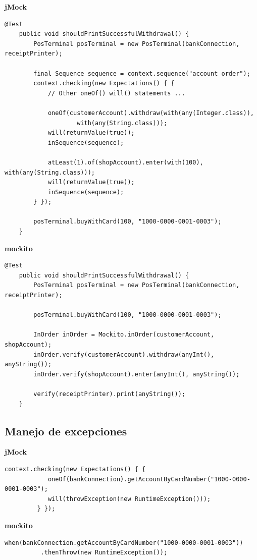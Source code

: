 \documentclass[]{beamer}
\begin{document}
\begin{frame}[fragile]
\textbf{jMock}
\begin{verbatim}
@Test
    public void shouldPrintSuccessfulWithdrawal() {
        PosTerminal posTerminal = new PosTerminal(bankConnection, receiptPrinter);

        final Sequence sequence = context.sequence("account order");
        context.checking(new Expectations() { {
            // Other oneOf() will() statements ...

            oneOf(customerAccount).withdraw(with(any(Integer.class)),
                    with(any(String.class)));
            will(returnValue(true));
            inSequence(sequence);

            atLeast(1).of(shopAccount).enter(with(100), with(any(String.class)));
            will(returnValue(true));
            inSequence(sequence);
        } });

        posTerminal.buyWithCard(100, "1000-0000-0001-0003");
    }
\end{verbatim}
\end{frame}

\begin{frame}[fragile]
  \textbf{mockito}
\begin{verbatim}
@Test
    public void shouldPrintSuccessfulWithdrawal() {
        PosTerminal posTerminal = new PosTerminal(bankConnection, receiptPrinter);

        posTerminal.buyWithCard(100, "1000-0000-0001-0003");

        InOrder inOrder = Mockito.inOrder(customerAccount, shopAccount);
        inOrder.verify(customerAccount).withdraw(anyInt(), anyString());
        inOrder.verify(shopAccount).enter(anyInt(), anyString());

        verify(receiptPrinter).print(anyString());
    }
\end{verbatim}
\end{frame}

\subsection{Manejo de excepciones}
\begin{frame}[fragile]
\textbf{jMock}
\begin{verbatim}
context.checking(new Expectations() { {
            oneOf(bankConnection).getAccountByCardNumber("1000-0000-0001-0003");
            will(throwException(new RuntimeException()));
         } });
\end{verbatim}
\textbf{mockito}
\begin{verbatim}
when(bankConnection.getAccountByCardNumber("1000-0000-0001-0003"))
          .thenThrow(new RuntimeException());
\end{verbatim}
\end{frame}
\end{document}
